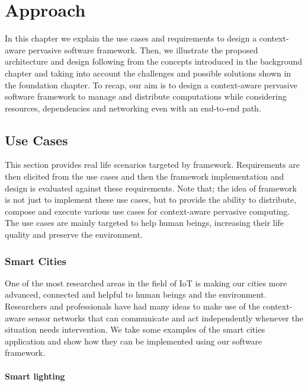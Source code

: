 
 \chapter{Approach}\label{chapter:Approach}
 In this chapter we explain the use cases and requirements to design a context-aware pervasive software framework. Then, we illustrate the  proposed architecture and design following from the concepts introduced in the background chapter and taking into account the challenges and possible solutions shown in the foundation chapter. To recap,  our aim is to design a context-aware pervasive software framework to manage and distribute computations while considering resources, dependencies and networking even with an end-to-end path.

\section{Use Cases}
This section provides real life scenarios targeted by framework. Requirements are then elicited from the use cases and then the framework implementation and design is evaluated against these requirements. Note that; the idea of framework is not just to implement these use cases, but to provide the ability to distribute, compose and execute various use cases for context-aware pervasive computing. The use cases are mainly targeted to help human beings, increasing their life quality and preserve the environment. 

\subsection{Smart Cities}
One of the most researched areas in the field of IoT is making our cities more advanced, connected and helpful to human beings and the environment. Researchers and professionals have had many ideas to make use of the context-aware sensor networks that can communicate and act independently whenever the situation needs intervention. We take some examples of the smart cities application and show how they can be implemented using our software framework.

\subsubsection{Smart lighting}

